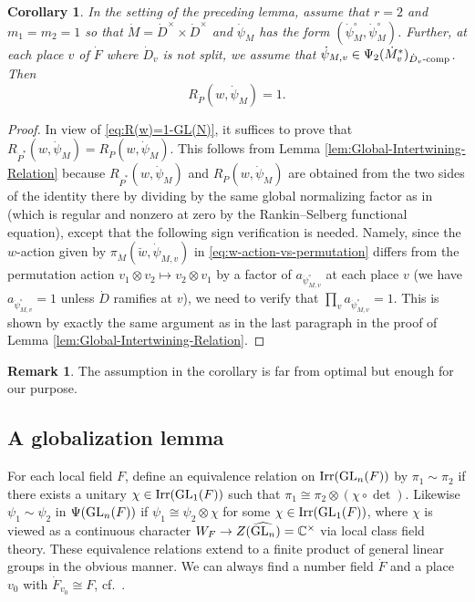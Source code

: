 \documentclass[11pt,reqno]{amsart}
\theoremstyle{plain}
\newtheorem{cor}[thm]{Corollary}
\theoremstyle{definition}
\newtheorem{rem}[thm]{Remark}
\newcommand{\C}{\mathbb{C}}
\newcommand{\GL}{\tu{GL}}
\newcommand{\Irr}{\tu{Irr}}
\newcommand{\tu}{\textup}
\renewcommand{\hat}{\widehat}
\numberwithin{equation}{subsection}
\begin{document}
\begin{cor}\label{cor:global-LIR}
In the setting of the preceding lemma, assume that $r=2$ and $m_1=m_2=1$ so that $\dot M=\dot D^\times\times \dot D^\times$ and $\dot\psi_M$ has the form $(\dot\psi_M^\circ,\dot\psi_M^\circ)$. Further, at each place $v$ of $\dot F$ where $\dot D_v$ is not split, we assume that $\dot\psi_{M,v}\in \Psi_2(\dot M^*_v)_{\dot D_v\tu{-comp}}$. Then
\[
R_{\dot P}(w,\dot \psi_M)=1.
\]
\end{cor}

\begin{proof}
In view of \eqref{eq:R(w)=1-GL(N)}, it suffices to prove that $R_{\dot P^*}(w,\dot \psi_M)=R_{\dot P}(w,\dot \psi_M)$.
This follows from Lemma \ref{lem:Global-Intertwining-Relation} because $R_{\dot P^*}(w,\dot \psi_M)$ and $R_{\dot P}(w,\dot \psi_M)$ are obtained from the two sides of the identity there by dividing by the same global normalizing factor as in \cite[(4.2.10)]{Arthur} (which is regular and nonzero at zero by the Rankin--Selberg functional equation), except that the following sign verification is needed. Namely, since the $w$-action given by $\pi_{\dot M}(\breve w,\dot\psi_{M,v})$ in \eqref{eq:w-action-vs-permutation} differs from the permutation action $v_1\otimes v_2\mapsto v_2\otimes v_1$ by a factor of $a_{\dot\psi^{\circ}_{M,v}}$ at each place $v$ (we have $a_{\dot\psi^{\circ}_{M,v}}=1$ unless $\dot D$ ramifies at $v$), we need to verify that $\prod_v a_{\dot\psi^{\circ}_{M,v}}=1$. This is shown by exactly the same argument as in the last paragraph in the proof of Lemma \ref{lem:Global-Intertwining-Relation}.
\end{proof}

\begin{rem}
The assumption in the corollary is far from optimal but enough for our purpose.
\end{rem}

\subsection{A globalization lemma}

For each local field $F$, define an equivalence relation on $\Irr(\GL_n(F))$ by $\pi_1\sim \pi_2$ if there exists a unitary $\chi \in \Irr(\GL_1(F))$ such that $\pi_1\cong \pi_2\otimes (\chi\circ \det)$. Likewise $\psi_1\sim\psi_2$ in $\Psi(\GL_n(F))$ if $\psi_1\cong \psi_2\otimes\chi$ for some $\chi\in \Irr(\GL_1(F))$, where $\chi$ is viewed as a continuous character $W_F\to Z(\hat{\GL_n})=\C^\times$ via local class field theory. These equivalence relations extend to a finite product of general linear groups in the obvious manner.
We can always find a number field $\dot F$ and a place $v_0$ with $\dot F_{v_0}\cong F$, cf.~\cite[Lem.~6.2.1]{Arthur}.
\end{document}

